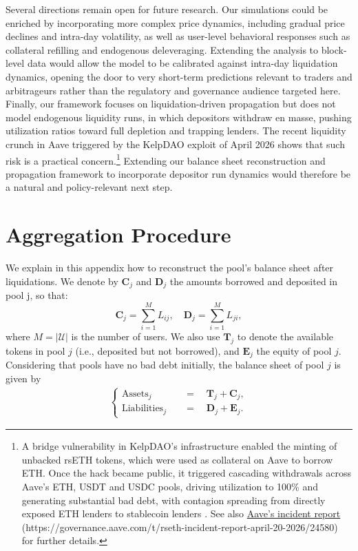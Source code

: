 \documentclass[a4paper,UKenglish,cleveref, autoref, thm-restate]{informs3}
\newcommand{\appendix}{%
  \setcounter{section}{0}%
  \renewcommand{\thesection}{Appendix~\Alph{section}}%
  \renewcommand{\theHsection}{Appendix.\Alph{section}}%
}
\begin{document}
Several directions remain open for future research. Our simulations could be enriched by incorporating more complex price dynamics, including gradual price declines and intra-day volatility, as well as user-level behavioral responses such as collateral refilling and endogenous deleveraging. Extending the analysis to block-level data would allow the model to be calibrated against intra-day liquidation dynamics, opening the door to very short-term predictions relevant to traders and arbitrageurs rather than the regulatory and governance audience targeted here. Finally, our framework focuses on liquidation-driven propagation but does not model endogenous liquidity runs, in which depositors withdraw en masse, pushing utilization ratios toward full depletion and trapping lenders. The recent liquidity crunch in Aave triggered by the KelpDAO exploit of April 2026 shows that such risk is a practical concern.\footnote{A bridge vulnerability in KelpDAO's infrastructure enabled the minting of unbacked rsETH tokens, which were used as collateral on Aave to borrow ETH. Once the hack became public, it triggered cascading withdrawals across Aave's ETH, USDT and USDC pools, driving utilization to 100\% and generating substantial bad debt, with contagion spreading from directly exposed ETH lenders to stablecoin lenders \citep{bristow2026}. See also \href{https://governance.aave.com/t/rseth-incident-report-april-20-2026/24580}{Aave's incident report} (https://governance.aave.com/t/rseth-incident-report-april-20-2026/24580) for further details.} Extending our balance sheet reconstruction and propagation framework to incorporate depositor run dynamics would therefore be a natural and policy-relevant next step.




\newpage

\appendix

\section{Aggregation Procedure}
\label{app:Aggregation}

We explain in this appendix how to reconstruct the pool's balance sheet after liquidations. We denote by \(\mathbf{C}_j\) and \(\mathbf{D}_j\) the amounts borrowed and deposited in pool j, so that:
\[
\mathbf{C}_j = \sum_{i=1}^M L_{ij}, \quad \mathbf{D}_j = \sum_{i=1}^M L_{ji},
\]
where $M = |\mathcal{U}|$ is the number of users. We also use \(\mathbf{T}_j\) to denote the available tokens in pool \(j\) (i.e., deposited but not borrowed), and \(\mathbf{E}_j\) the equity of pool \(j\). Considering that pools have no bad debt initially, the balance sheet of pool \(j\) is given by
\begin{align*}
\begin{cases}
    \text{Assets}_j \quad&=\quad \mathbf{T}_j + \mathbf{C}_j, \\
    \text{Liabilities}_j\quad &=\quad \mathbf{D}_j + \mathbf{E}_j.
\end{cases}
\end{align*}
\end{document}
